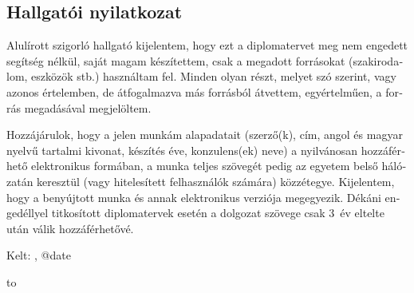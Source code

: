 \begin{otherlanguage}{magyar}

\chapter*{Hallgatói nyilatkozat}
{}
\thispagestyle{plain}

Alulírott \textbf{\authorihun} szigorló hallgató kijelentem, hogy ezt
a diplomatervet meg nem engedett segítség nélkül, saját magam
készítettem, csak a megadott forrásokat (szakirodalom, eszközök stb.)
használtam fel. Minden olyan részt, melyet szó szerint, vagy azonos
értelemben, de átfogalmazva más forrásból átvettem, egyértelműen, a
forrás megadásával megjelöltem.

Hozzájárulok, hogy a jelen munkám alapadatait (szerző(k), cím, angol
és magyar nyelvű tartalmi kivonat, készítés éve, konzulens(ek) neve) a
  nyilvánosan hozzáférhető elektronikus
formában, a munka teljes szövegét pedig az egyetem belső hálózatán
keresztül (vagy hitelesített felhasználók számára)
közzétegye. Kijelentem, hogy a benyújtott munka és annak elektronikus
verziója megegyezik. Dékáni engedéllyel titkosított diplomatervek
esetén a dolgozat szövege csak 3~év eltelte után válik hozzáférhetővé.

\vspace{4ex}

\noindent Kelt: \viktdklocation, \csname @date\endcsname

\vspace{20ex}

\hfill\begin{minipage}{0.4\linewidth}
\centering\hbox to \par
\centering\authorihun\par
\end{minipage}

\end{otherlanguage}